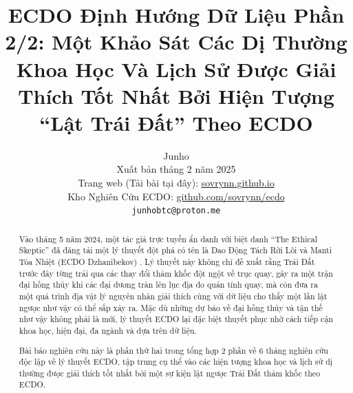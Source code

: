 \documentclass[10pt,twocolumn,letterpaper]{article}
\begin{document}
\title{ECDO Định Hướng Dữ Liệu Phần 2/2: Một Khảo Sát Các Dị Thường Khoa Học Và Lịch Sử Được Giải Thích Tốt Nhất Bởi Hiện Tượng “Lật Trái Đất” Theo ECDO}

\author{Junho\\
Xuất bản tháng 2 năm 2025\\
Trang web (Tải bài tại đây): \href{https://sovrynn.github.io}{sovrynn.github.io}\\
Kho Nghiên Cứu ECDO: \href{https://github.com/sovrynn/ecdo}{github.com/sovrynn/ecdo}\\
{\tt\small junhobtc@proton.me}
}

\maketitle

\begin{abstract}
Vào tháng 5 năm 2024, một tác giả trực tuyến ẩn danh với biệt danh “The Ethical Skeptic” \cite{0} đã đăng tải một lý thuyết đột phá có tên là Dao Động Tách Rời Lõi và Manti Tỏa Nhiệt (ECDO Dzhanibekov) \cite{1}. Lý thuyết này không chỉ đề xuất rằng Trái Đất trước đây từng trải qua các thay đổi thảm khốc đột ngột về trục quay, gây ra một trận đại hồng thủy khi các đại dương tràn lên lục địa do quán tính quay, mà còn đưa ra một quá trình địa vật lý nguyên nhân giải thích cùng với dữ liệu cho thấy một lần lật ngược như vậy có thể sắp xảy ra. Mặc dù những dự báo về đại hồng thủy và tận thế như vậy không phải là mới, lý thuyết ECDO lại đặc biệt thuyết phục nhờ cách tiếp cận khoa học, hiện đại, đa ngành và dựa trên dữ liệu.

Bài báo nghiên cứu này là phần thứ hai trong tổng hợp 2 phần về 6 tháng nghiên cứu độc lập \cite{2,20} về lý thuyết ECDO, tập trung cụ thể vào các hiện tượng khoa học và lịch sử dị thường được giải thích tốt nhất bởi một sự kiện lật ngược Trái Đất thảm khốc theo ECDO.

\end{abstract}
\end{document}
